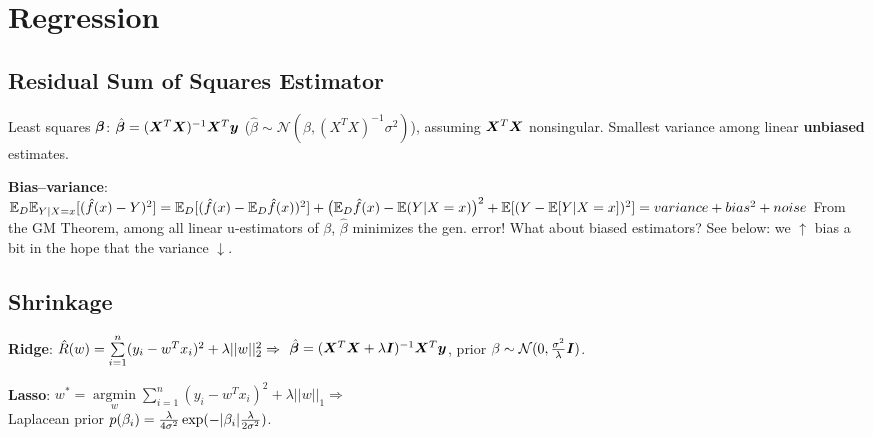 \section{Regression}

\subsection*{Residual Sum of Squares Estimator}
Least squares $\boldsymbol{\beta}$:
$\hat{\boldsymbol{\beta}} = (\boldsymbol{X}^T\boldsymbol{X})^{-1}\boldsymbol{X}^T \boldsymbol{y}$ ($\hat{\beta} \sim \mathcal{N}(\beta,(X^TX)^{-1}\sigma^2)$),
assuming $\boldsymbol{X}^T\boldsymbol{X}$ nonsingular.
Smallest variance among linear \textbf{unbiased} estimates.

\textbf{Bias--variance}:
$\mathbb E_D \mathbb E_{Y | X=x}[(\hat{f}(x) - Y)^2]
=
\mathbb E_D [(\hat{f}(x) - \mathbb E_D \hat{f}(x))^2]
+ \big( \mathbb E_D \hat{f}(x) - \mathbb E(Y | X=x) \big)^2
+ \mathbb E [(Y - \mathbb E[Y | X=x])^2]
=
variance + bias^2 + noise
$
From the GM Theorem, among all linear u-estimators of $\beta$, $\hat \beta$ minimizes the gen. error! What about biased estimators? See below: we $\uparrow$ bias a bit in the hope that the variance $\downarrow$.


\subsection*{Shrinkage}
\textbf{Ridge}:
$\hat{R}(w) = \sum \limits_{i=1}^n (y_i - w^Tx_i)^2 + \lambda ||w||_2^2 \Rightarrow\\$
$\hat{\boldsymbol{\beta}} = (\boldsymbol{X}^T\boldsymbol{X} + \lambda \boldsymbol{I})^{-1}\boldsymbol{X}^T \boldsymbol{y}$,
prior $\beta \sim \mathcal{N}(0, \frac{\sigma^2}{\lambda} \boldsymbol{I})$.

\textbf{Lasso}:
$w^* = \underset{w}{\operatorname{argmin}} \sum \limits_{i=1}^n (y_i - w^Tx_i)^2 + \lambda ||w||_1 \Rightarrow$\\
Laplacean prior $p(\beta_i) = \frac{\lambda}{4\sigma^2} \exp(-\lvert\beta_i\rvert \frac{\lambda}{2\sigma^2})$.

